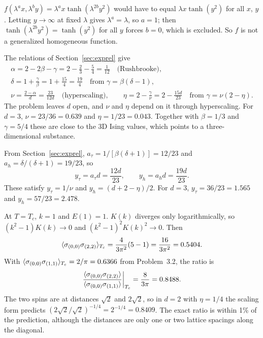  $f(\lambda^ax,\lambda^by) = \lambda^ax\tanh(\lambda^{2b}y^2)$ would have to equal $\lambda x\tanh(y^2)$ for
all $x$, $y$. Letting $y\to\infty$ at fixed $\lambda$ gives $\lambda^a = \lambda$, so $a = 1$; then
$\tanh(\lambda^{2b}y^2) = \tanh(y^2)$ for all $y$ forces $b = 0$, which is excluded. So $f$ is not a generalized
homogeneous function.

 The relations of Section~\ref{sec:exprel} give
\begin{gather}
  \alpha = 2-2\beta-\gamma = 2-\frac{2}{3}-\frac{5}{4} = \frac{1}{12}\quad\text{(Rushbrooke)},\\
  \delta = 1+\frac{\gamma}{\beta} = 1+\frac{15}{4} = \frac{19}{4}\quad\text{from }\gamma = \beta(\delta-1),\\
  \nu = \frac{2-\alpha}{d} = \frac{23}{12d}\quad\text{(hyperscaling)},\qquad
  \eta = 2-\frac{\gamma}{\nu} = 2-\frac{15d}{23}\quad\text{from }\gamma = \nu(2-\eta).
\end{gather}
The problem leaves $d$ open, and $\nu$ and $\eta$ depend on it through hyperscaling. For $d = 3$, $\nu = 23/36 = 0.639$
and $\eta = 1/23 = 0.043$. Together with $\beta = 1/3$ and $\gamma = 5/4$ these are close to the 3D Ising values, which
points to a three-dimensional substance.

 From Section~\ref{sec:exprel}, $a_\tau = 1/[\beta(\delta+1)] = 12/23$ and $a_h = \delta/(\delta+1) = 19/23$,
so
\begin{equation}
  y_\tau = a_\tau d = \frac{12d}{23},\qquad y_h = a_hd = \frac{19d}{23}.
\end{equation}
These satisfy $y_\tau = 1/\nu$ and $y_h = (d+2-\eta)/2$. For $d = 3$, $y_\tau = 36/23 = 1.565$ and
$y_h = 57/23 = 2.478$.

At $T = T_c$, $k = 1$ and $E(1) = 1$. $K(k)$ diverges only logarithmically, so $(k^2-1)K(k)\to 0$ and
$(k^2-1)^2K(k)^2\to 0$. Then
\begin{equation}
  \langle \sigma_{(0,0)}\sigma_{(2,2)}\rangle_{T_c} = \frac{4}{3\pi^2}(5-1) = \frac{16}{3\pi^2} = 0.5404 .
\end{equation}
With $\langle \sigma_{(0,0)}\sigma_{(1,1)}\rangle_{T_c} = 2/\pi = 0.6366$ from Problem~3.2, the ratio is
\begin{equation}
  \frac{\langle \sigma_{(0,0)}\sigma_{(2,2)}\rangle}{\langle \sigma_{(0,0)}\sigma_{(1,1)}\rangle}\bigg|_{T_c} = \frac{8}{3\pi} = 0.8488 .
\end{equation}
The two spins are at distances $\sqrt2$ and $2\sqrt2$, so in $d = 2$ with $\eta = 1/4$ the scaling form predicts
$(2\sqrt2/\sqrt2)^{-1/4} = 2^{-1/4} = 0.8409$. The exact ratio is within 1\% of the prediction, although the distances
are only one or two lattice spacings along the diagonal.

